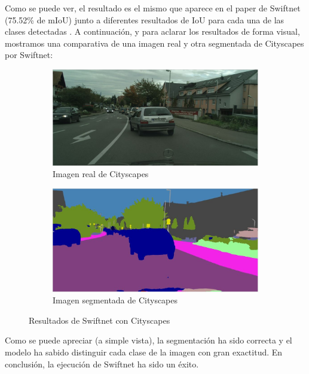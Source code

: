 Como se puede ver, el resultado es el mismo que aparece en el paper de Swiftnet (75.52\% de \ac{mIoU}) junto a diferentes resultados de \ac{IoU} para cada una de las clases detectadas \cite{swiftnet}. A continuación, y para aclarar los resultados de forma visual, mostramos una comparativa de una imagen real y otra segmentada de Cityscapes por Swiftnet:

\begin{figure}[H]
\centering
  \begin{subfigure}[b]{0.45\linewidth}
    \includegraphics[width=\linewidth]{Figuras/Imagen_Cityscapes_Real.eps}
    \caption{Imagen real de Cityscapes}
  \end{subfigure}
    \begin{subfigure}[b]{0.45\linewidth}
    \includegraphics[width=\linewidth]{Figuras/Imagen_Cityscapes_Segmentada.eps}
    \caption{Imagen segmentada de Cityscapes}
  \end{subfigure}
  \caption{Resultados de Swiftnet con Cityscapes}
\end{figure}

Como se puede apreciar (a simple vista), la segmentación ha sido correcta y el modelo ha sabido distinguir cada clase de la imagen con gran exactitud. En conclusión, la ejecución de Swiftnet ha sido un éxito.

